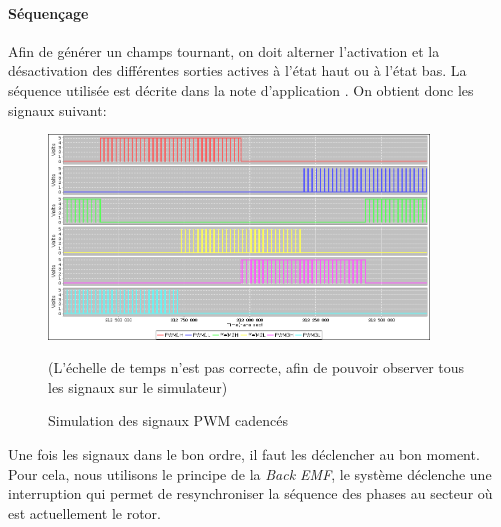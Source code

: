   			\paragraph{Séquençage}
  			Afin de générer un champs tournant, on doit alterner l'activation et la désactivation des différentes sorties actives à l'état haut ou à l'état bas. La séquence utilisée est décrite dans la note d'application \cite{AN857}.
  			On obtient donc les signaux suivant:
  			\begin{figure}[hb]\begin{center}
	  			\includegraphics[width=0.9\textwidth]{../Illus/PWMCadence2015.png}
	  			\caption{Simulation des signaux PWM cadencés}(L'échelle de temps n'est pas correcte, afin de pouvoir observer tous les signaux sur le simulateur)
	  			\label{imgPWM}
	  			\end{center}
  			\end{figure}
  			Une fois les signaux dans le bon ordre, il faut les déclencher au bon moment. Pour cela, nous utilisons le principe de la \textit{Back EMF}, le système déclenche une interruption qui permet de resynchroniser la séquence des phases au secteur où est actuellement le rotor.

